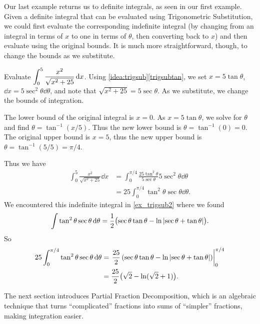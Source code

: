 Our last example returns us to definite integrals, as seen in our first example. Given a definite integral that can be evaluated using Trigonometric Substitution, we could first evaluate the corresponding indefinite integral (by changing from an integral in terms of $x$ to one in terms of $\theta$, then converting back to $x$) and then evaluate using the original bounds. It is much more straightforward, though, to change the bounds as we substitute.

\begin{example}\label{ex_trigsub6}%
Evaluate $\displaystyle\int_0^5\frac{x^2}{\sqrt{x^2+25}}\operatorname{d}\! x$.
\solution
Using \autoref{idea:trigsub}\ref*{trigsubtan}, we set $x=5\tan\theta$, $\dd x = 5\sec^2\theta\dd\theta$, and note that $\sqrt{x^2+25} = 5\sec\theta$. As we substitute, we change the bounds of integration.

The lower bound of the original integral is $x=0$. As $x=5\tan\theta$, we solve for $\theta$ and find $\theta = \tan^{-1}(x/5)$. Thus the new lower bound is $\theta = \tan^{-1}(0) = 0$. The original upper bound is $x=5$, thus the new upper bound is $\theta = \tan^{-1}(5/5) = \pi/4$. 

Thus we have 
\begin{align*}
\int_0^5\frac{x^2}{\sqrt{x^2+25}}\dd x &= \int_0^{\pi/4} \frac{25\tan^2\theta}{5\sec\theta}5\sec^2\theta\dd\theta\\
		&= 25\int_0^{\pi/4} \tan^2\theta\sec\theta\dd\theta.
\end{align*}
We encountered this indefinite integral in \autoref{ex_trigsub2} where we found 
\[\int \tan^2\theta\sec\theta \operatorname{d}\!\theta = \frac12\bigl(\sec\theta\tan\theta-\ln\left\lvert \sec\theta+\tan\theta \right\rvert\bigr).\]
So
\begin{align*}
	25\int_0^{\pi/4} \tan^2\theta\sec\theta\operatorname{d}\!\theta
	&= \left.\frac{25}2\left(\sec\theta\tan\theta-\ln\left\lvert \sec\theta+\tan\theta \right\rvert\right)\right|_0^{\pi/4}\\
	&= \frac{25}2\bigl(\sqrt2-\ln(\sqrt2+1)\bigr)
	.
\end{align*}
\end{example}

%

The next section introduces Partial Fraction Decomposition, which is an algebraic technique that turns ``complicated'' fractions into sums of ``simpler'' fractions, making integration easier.

